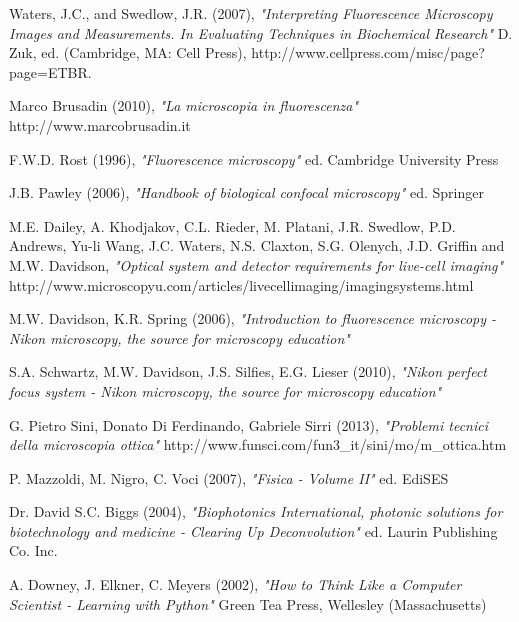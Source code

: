 \clearpage{\pagestyle{empty}\cleardoublepage}

\begin{thebibliography}{3}


 Waters, J.C., and Swedlow, J.R. (2007), \emph {"Interpreting Fluorescence Microscopy Images and Measurements. In Evaluating Techniques in Biochemical Research"} \newline D. Zuk, ed. (Cambridge, MA: Cell Press), \newline http://www.cellpress.com/misc/page?page=ETBR.

 Marco Brusadin (2010), \emph{"La microscopia in fluorescenza"} \newline  http://www.marcobrusadin.it

 F.W.D. Rost (1996), \emph{"Fluorescence microscopy"} \newline ed. Cambridge University Press

 J.B. Pawley (2006), \emph{"Handbook of biological confocal microscopy"} \newline ed. Springer

 M.E. Dailey, A. Khodjakov, C.L. Rieder, M. Platani, J.R. Swedlow, P.D. Andrews, Yu-li Wang, J.C. Waters, N.S. Claxton, S.G. Olenych, J.D. Griffin and M.W. Davidson, \emph{"Optical system and detector requirements for live-cell imaging"} \newline http://www.microscopyu.com/articles/livecellimaging/imagingsystems.html

 M.W. Davidson, K.R. Spring (2006), \emph{"Introduction to fluorescence microscopy - Nikon microscopy, the source for microscopy education"} 

 S.A. Schwartz, M.W. Davidson, J.S. Silfies, E.G. Lieser (2010), \emph{"Nikon perfect focus system - Nikon microscopy, the source for microscopy education"} 

 G. Pietro Sini, Donato Di Ferdinando, Gabriele Sirri (2013), \emph{"Problemi tecnici della microscopia ottica"} \newline http://www.funsci.com/fun3\_it/sini/mo/m\_ottica.htm

 P. Mazzoldi, M. Nigro, C. Voci (2007), \emph{"Fisica - Volume II"} \newline ed. EdiSES

 Dr. David S.C. Biggs (2004), \emph{"Biophotonics International, photonic solutions for biotechnology and medicine - Clearing Up Deconvolution"} \newline ed. Laurin Publishing Co. Inc.

 A. Downey, J. Elkner, C. Meyers (2002), \emph{"How to Think Like a Computer Scientist - Learning with Python"} \newline Green Tea Press, Wellesley (Massachusetts)

\end{thebibliography} 
